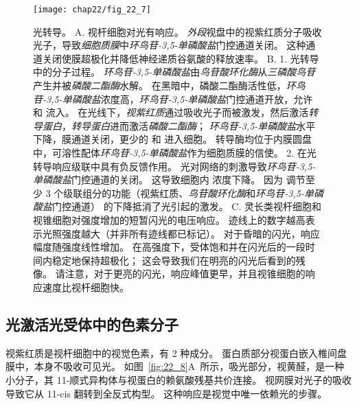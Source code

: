 \begin{figure}[htbp]
	\centering
	\texttt{[image: chap22/fig\_22\_7]}
	\caption{光转导。
		A. 视杆细胞对光有响应。
		\textit{外段}视盘中的视紫红质分子吸收光子，导致\textit{细胞质膜}中\textit{环鸟苷-3,5-单磷酸盐}门控通道关闭。
		这种通道关闭使膜超极化并降低神经递质谷氨酸的释放速率\cite{alberts2017molecular}。
		B. 1. 光转导中的分子过程。
		\textit{环鸟苷-3,5-单磷酸盐}由\textit{鸟苷酸环化酶}从\textit{三磷酸鸟苷}产生并被\textit{磷酸二酯酶}水解。
		在黑暗中，磷酸二酯酶活性低，\textit{环鸟苷-3,5-单磷酸盐}浓度高，\textit{环鸟苷-3,5-单磷酸盐}门控通道开放，允许  和  流入。
		在光线下，\textit{视紫红质}通过吸收光子而被激发，然后激活\textit{转导蛋白}，\textit{转导蛋白}进而激活\textit{磷酸二酯酶}；
		\textit{环鸟苷-3,5-单磷酸盐}水平下降，膜通道关闭，更少的  和  进入细胞。
		转导酶均位于内膜圆盘中，可溶性配体\textit{环鸟苷-3,5-单磷酸盐}作为细胞质膜的信使。
		2.  在光转导响应级联中具有负反馈作用。
		光对网络的刺激导致\textit{环鸟苷-3,5-单磷酸盐}门控通道的关闭。
		这导致细胞内  浓度下降。
		因为  调节至少 3 个级联组分的功能（视紫红质、\textit{鸟苷酸环化酶}和\textit{环鸟苷-3,5-单磷酸盐}门控通道） 的下降抵消了光引起的激发。
		C. 灵长类视杆细胞和视锥细胞对强度增加的短暂闪光的电压响应。
		迹线上的数字越高表示光照强度越大（并非所有迹线都已标记）。 
		对于昏暗的闪光，响应幅度随强度线性增加。 
		在高强度下，受体饱和并在闪光后的一段时间内稳定地保持超极化；
		这会导致我们在明亮的闪光后看到的残像。 
		请注意，对于更亮的闪光，响应峰值更早，并且视锥细胞的响应速度比视杆细胞快\cite{schneeweis1995photovoltage}。}
	\label{fig:22_7}
\end{figure}



\subsection{光激活光受体中的色素分子}

视紫红质是视杆细胞中的视觉色素，有 2 种成分。
蛋白质部分视蛋白嵌入椎间盘膜中，本身不吸收可见光。 
如图~\ref{fig:22_8}A~所示，吸光部分，视黄醛，是一种小分子，其 11-顺式异构体与视蛋白的赖氨酸残基共价连接。
视网膜对光子的吸收导致它从 11-cis 翻转到全反式构型。
这种响应是视觉中唯一依赖光的步骤。


